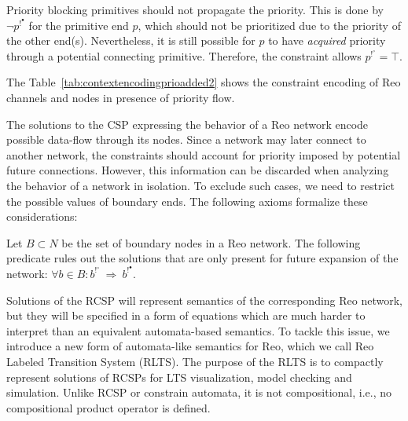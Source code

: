 Priority blocking primitives should not propagate the priority. This is  done by  $\neg p^{!^\bullet}$ for the primitive end $p$, which should not be prioritized due to the priority of the other end(s). Nevertheless, it is still possible for $p$ to have \emph{acquired} priority through a potential connecting primitive. Therefore, the constraint allows $p^{!^\circ} = \top$.

The Table~\ref{tab:contextencodingprioadded2} shows the constraint encoding of Reo channels and nodes in presence of priority flow. 

The solutions to the CSP expressing the behavior of a Reo network encode possible data-flow through its nodes. Since a network may later connect to another network, the constraints should account for priority imposed by potential future connections. However, this information can be discarded when analyzing the behavior of a network in isolation. To exclude such cases, we need to restrict the possible values of boundary ends. The following axioms formalize these considerations:

\begin{axiom}
\label{ax:grnd}
Let $B \subset N$ be the set of boundary nodes in a Reo network. The following predicate rules out the solutions that are only present for future expansion of the network:
$\forall b \in B: b^{!^\circ}\ \Rightarrow\ b^{!^\bullet}$.
\end{axiom}

Solutions of the RCSP will represent semantics of the corresponding Reo network, but they will be specified in a form of equations which are much harder to interpret than an equivalent automata-based semantics. 
To tackle this issue, we introduce a new form of automata-like semantics for Reo, which we call Reo Labeled Transition System (RLTS). 
The purpose of the RLTS is to compactly represent solutions of RCSPs for LTS visualization, model checking and simulation. Unlike RCSP or constrain automata, it is not compositional, i.e., no compositional product operator is defined.


